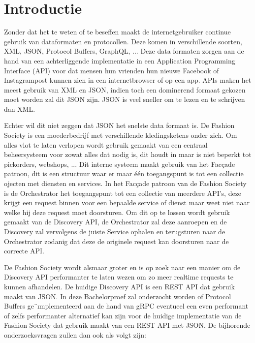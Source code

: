 
\section{Introductie} %
\label{sec:introductie}

Zonder dat het te weten of te beseffen maakt de internetgebruiker continue gebruik van dataformaten en protocollen. Deze komen in verschillende soorten, XML, JSON, Protocol Buffers, GraphQL, ... Deze data formaten zorgen aan de hand van een achterliggende implementatie in een Application Programming Interface (API) voor dat mensen hun vrienden hun nieuwe Facebook of Instagrampost kunnen zien in een internetbrowser of op een app. 
APIs maken het meest gebruik van XML en JSON, indien toch een dominerend formaat gekozen moet worden zal dit JSON zijn. JSON is veel sneller om te lezen en te schrijven dan XML.

Echter wil dit niet zeggen dat JSON het snelste data formaat is. 
De Fashion Society is een moederbedrijf met verschillende kledingsketens onder zich. Om alles vlot te laten verlopen wordt gebruik gemaakt van een centraal beheersysteem voor zowat alles dat nodig is, dit houdt in maar is niet beperkt tot pickorders, webshops, ... Dit interne systeem maakt gebruik van het Facçade patroon, dit is een structuur waar er maar één toegangspunt is tot een collectie ojecten met diensten en services. In het Facçade patroon van de Fashion Society is de Orchestrator het toegangspunt tot een collectie van meerdere API’s, deze krijgt een request binnen voor een bepaalde service of dienst maar weet niet naar welke hij deze request moet doorsturen. Om dit op te lossen wordt gebruik gemaakt van de Discovery API, de Orchestrator zal deze aanroepen en de Discovery zal vervolgens de juiste Service ophalen en terugsturen naar de Orchestrator zodanig dat deze de originele request kan doorsturen naar de correcte API.

De Fashion Society wordt alsmaar groter en is op zoek naar een manier om de Discovery API performanter te laten wezen om zo meer realtime requests te kunnen afhandelen. De huidige Discovery API is een REST API dat gebruik maakt van JSON. In deze Bachelorproef zal onderzocht worden of Protocol Buffers ge¨ımplementeerd aan de hand van gRPC eventueel een even performant of zelfs performanter alternatief kan zijn voor de huidige implementatie van de Fashion Society dat gebruik maakt van een REST API met JSON. De bijhorende onderzoeksvragen zullen dan ook als volgt zijn:


